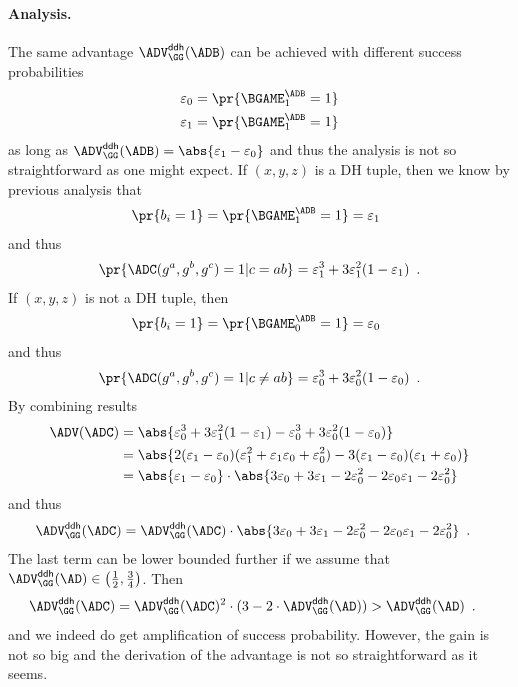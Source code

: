 \documentclass{crypto-exercise}
\begin{document}
\begin{solution}
\paragraph{Analysis.}
The same advantage $\ADVDDH{\GG}{\ADB}$ can be achieved with different success probabilities
\begin{align*}
\varepsilon_0&=\pr{\BGAME_1^\ADB=1}\\
\varepsilon_1&=\pr{\BGAME_1^\ADB=1}
\end{align*}
as long as $\ADVDDH{\GG}{\ADB}=\abs{\varepsilon_1-\varepsilon_0}$ and thus the analysis is not so straightforward as one might expect. 
If $(x,y,z)$ is a DH tuple, then we know by previous analysis that
\begin{align*}
    \pr{b_i=1}=\pr{\smash{\BGAME_1^\ADB=1}}=\varepsilon_1\enspace
\end{align*}
and thus 
\begin{align*}
\pr{\smash{\ADC(g^a,g^b,g^{c})=1}|c=ab}=\varepsilon_1^3 +3\varepsilon_1^2(1-\varepsilon_1)\enspace.
\end{align*}
If $(x,y,z)$ is not a DH tuple, then 
\begin{align*}
    \pr{b_i=1}=\pr{\smash{\BGAME_0^\ADB=1}}=\varepsilon_0\enspace
\end{align*}
and thus
\begin{align*}
    \pr{\ADC(g^a,g^b,g^c)=1|c\neq ab}%
    =\varepsilon_0^3 +3\varepsilon_0^2(1-\varepsilon_0)\enspace.
\end{align*}
By combining results
\begin{align*}
\ADV(\ADC)&
=\abs{\varepsilon_0^3 +3\varepsilon_1^2(1-\varepsilon_1)-\varepsilon_0^3 +3\varepsilon_0^2(1-\varepsilon_0)}\\
    &=\abs{2(\varepsilon_1 -
      \varepsilon_0)(\varepsilon_1^2 + \varepsilon_1\varepsilon_0 +
      \varepsilon_0^2)
      - 3(\varepsilon_1 - \varepsilon_0)(\varepsilon_1 + \varepsilon_0)}\\
    &=\abs{\varepsilon_1 - \varepsilon_0}
    \cdot \abs{\smash{3\varepsilon_0 +3\varepsilon_1 -
        2\varepsilon_0^2 - 2\varepsilon_0\varepsilon_1 -
        2\varepsilon_0^2}}
\end{align*}
and thus
\begin{align*}
    \ADVDDH{\GG}{\ADC}%
    &=\ADVDDH{\GG}{\ADC}\cdot
    \abs{\smash{3\varepsilon_0 +3\varepsilon_1 - 2\varepsilon_0^2 -
        2\varepsilon_0\varepsilon_1 - 2\varepsilon_0^2}}\enspace.
\end{align*}
The last term can be lower bounded further if we assume that $\ADVDDH{\GG}{\AD}\in\bigl(\frac{1}{2},\frac{3}{4}\bigr)$. Then  
\begin{align*}
    \ADVDDH{\GG}{\ADC}&=
    \ADVDDH{\GG}{\ADC}^2 \cdot (3 - 2\cdot\ADVDDH{\GG}{\AD} )
    >\ADVDDH{\GG}{\AD}\enspace.
\end{align*}
and we indeed do get amplification of success probability. 
However, the gain is not so big and the derivation of the advantage is not so straightforward as it seems.


\end{solution}
\end{document}
